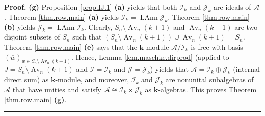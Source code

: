 \documentclass[numbers=enddot,12pt,final,onecolumn,notitlepage]{scrartcl}%
\numberwithin{exer}{subsection}
\theoremstyle{definition}
\newenvironment{proof}[1][Proof]{\noindent\textbf{#1.} }{\ \rule{0.5em}{0.5em}}
\begin{document}
\begin{proof}
\textbf{(g)} Proposition \ref{prop.IJ.1} \textbf{(a)} yields that both
$\mathcal{I}_{k}$ and $\mathcal{J}_{k}$ are ideals of $\mathcal{A}$. Theorem
\ref{thm.row.main} \textbf{(a)} yields $\mathcal{I}_{k}=\operatorname*{LAnn}%
\mathcal{J}_{k}$. Theorem \ref{thm.row.main} \textbf{(b)} yields
$\mathcal{J}_{k}=\operatorname*{LAnn}\mathcal{I}_{k}$. Clearly, $S_{n}%
\setminus\operatorname*{Av}\nolimits_{n}\left(  k+1\right)  $ and
$\operatorname*{Av}\nolimits_{n}\left(  k+1\right)  $ are two disjoint subsets
of $S_{n}$ such that $\left(  S_{n}\setminus\operatorname*{Av}\nolimits_{n}%
\left(  k+1\right)  \right)  \cup\operatorname*{Av}\nolimits_{n}\left(
k+1\right)  =S_{n}$. Theorem \ref{thm.row.main} \textbf{(e)} says that the
$\mathbf{k}$-module $\mathcal{A}/\mathcal{I}_{k}$ is free with basis $\left(
\overline{w}\right)  _{w\in S_{n}\setminus\operatorname*{Av}\nolimits_{n}%
\left(  k+1\right)  }$. Hence, Lemma \ref{lem.maschke.dirprod} (applied to
$J=S_{n}\setminus\operatorname*{Av}\nolimits_{n}\left(  k+1\right)  $ and
$\mathcal{I}=\mathcal{I}_{k}$ and $\mathcal{J}=\mathcal{J}_{k}$) yields that
$\mathcal{A}=\mathcal{I}_{k}\oplus\mathcal{J}_{k}$ (internal direct sum) as
$\mathbf{k}$-module, and moreover, $\mathcal{I}_{k}$ and $\mathcal{J}_{k}$ are
nonunital subalgebras of $\mathcal{A}$ that have unities and satisfy
$\mathcal{A}\cong\mathcal{I}_{k}\times\mathcal{J}_{k}$ as $\mathbf{k}%
$-algebras. This proves Theorem \ref{thm.row.main} \textbf{(g)}.
\end{proof}
\end{document}

